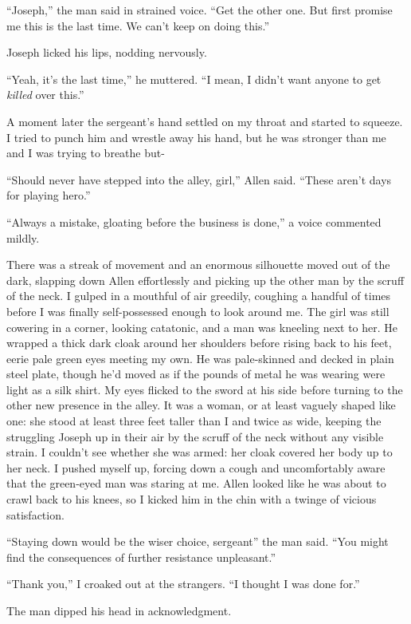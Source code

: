 \documentclass[12pt, openany]{book}
\begin{document}
“Joseph,” the man said in strained voice. “Get the other one. But first promise me this is the last time. We can’t keep on doing this.”

Joseph licked his lips, nodding nervously.

“Yeah, it’s the last time,” he muttered. “I mean, I didn’t want anyone to get \textit{killed} over this.”

A moment later the sergeant’s hand settled on my throat and started to squeeze. I tried to punch him and wrestle away his hand, but he was stronger than me and I was trying to breathe but-

“Should never have stepped into the alley, girl,” Allen said. “These aren’t days for playing hero.”

“Always a mistake, gloating before the business is done,” a voice commented mildly.

There was a streak of movement and an enormous silhouette moved out of the dark, slapping down Allen effortlessly and picking up the other man by the scruff of the neck. I gulped in a mouthful of air greedily, coughing a handful of times before I was finally self-possessed enough to look around me. The girl was still cowering in a corner, looking catatonic, and a man was kneeling next to her. He wrapped a thick dark cloak around her shoulders before rising back to his feet, eerie pale green eyes meeting my own. He was pale-skinned and decked in plain steel plate, though he’d moved as if the pounds of metal he was wearing were light as a silk shirt. My eyes flicked to the sword at his side before turning to the other new presence in the alley. It was a woman, or at least vaguely shaped like one: she stood at least three feet taller than I and twice as wide, keeping the struggling Joseph up in their air by the scruff of the neck without any visible strain. I couldn’t see whether she was armed: her cloak covered her body up to her neck. I pushed myself up, forcing down a cough and uncomfortably aware that the green-eyed man was staring at me. Allen looked like he was about to crawl back to his knees, so I kicked him in the chin with a twinge of vicious satisfaction.

“Staying down would be the wiser choice, sergeant” the man said. “You might find the consequences of further resistance unpleasant.”

“Thank you,” I croaked out at the strangers. “I thought I was done for.”

The man dipped his head in acknowledgment.
\end{document}
